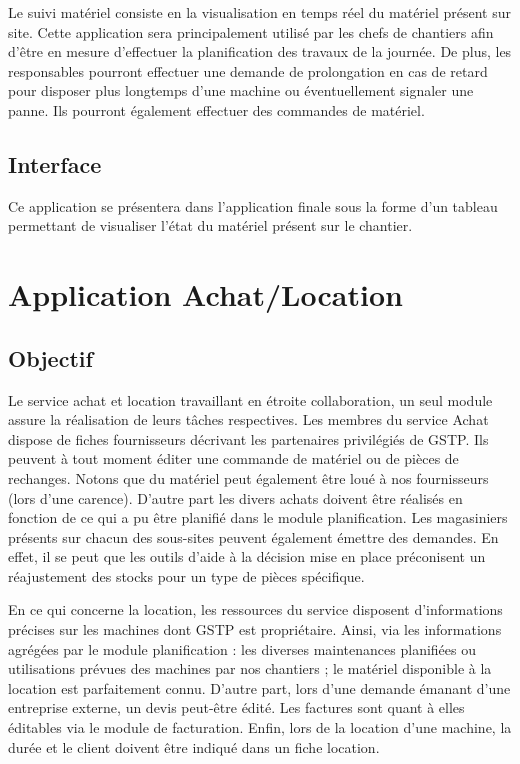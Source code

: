         Le suivi matériel consiste en la visualisation en temps réel du matériel présent sur site.  Cette application sera principalement utilisé par les chefs de chantiers afin d'être en mesure d'effectuer la planification des travaux de la journée.
	De plus, les responsables pourront effectuer une demande de prolongation en cas de retard pour disposer plus longtemps d'une machine ou éventuellement signaler une panne. Ils pourront également effectuer des commandes de matériel.

	\subsection {Interface}
	Ce application se présentera dans l'application finale sous la forme d'un tableau permettant de visualiser l'état du matériel présent sur le chantier. 

\section{Application Achat/Location}
	\subsection{Objectif}
	Le service achat et location travaillant en étroite collaboration, un seul module assure la réalisation de leurs tâches respectives. Les membres du service Achat dispose de fiches fournisseurs décrivant les partenaires privilégiés de GSTP. Ils peuvent à tout moment éditer une commande de matériel ou de pièces de rechanges. Notons que du matériel peut également être loué à nos fournisseurs (lors d’une carence). D’autre part les divers achats doivent être réalisés en fonction de ce qui a pu être planifié dans le module planification. 
	Les magasiniers présents sur chacun des sous-sites peuvent également émettre des demandes. En effet, il se peut que les outils d’aide à la décision mise en place préconisent un réajustement des stocks pour un type de pièces spécifique.

	En ce qui concerne la location, les ressources du service disposent d’informations précises sur les machines dont GSTP est propriétaire. Ainsi, via les informations agrégées par le module planification : les diverses maintenances planifiées ou utilisations prévues des machines par nos chantiers ; le matériel disponible à la location est parfaitement connu. 
	D’autre part, lors d’une demande émanant d’une entreprise externe, un devis peut-être édité. Les factures sont quant à elles éditables via le module de facturation. Enfin, lors de la location d’une machine, la durée et le client doivent être indiqué dans un fiche location.

